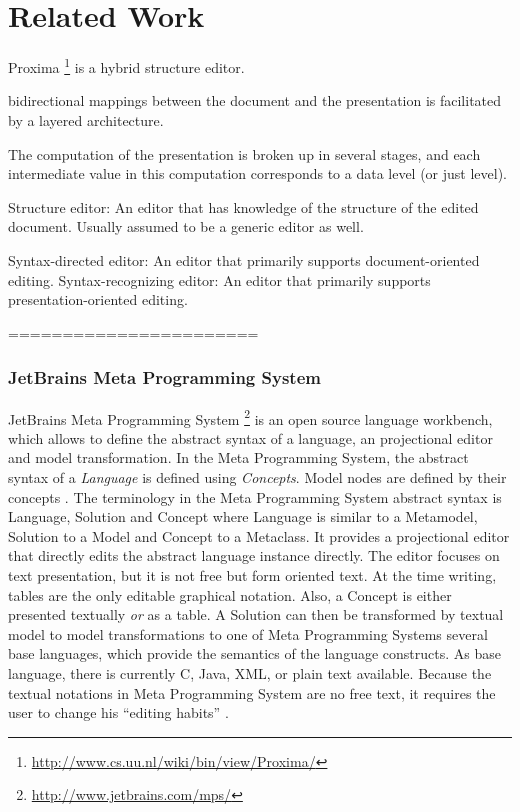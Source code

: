 \chapter{Related Work}

Proxima \footnote{\raggedright \url{http://www.cs.uu.nl/wiki/bin/view/Proxima/}}  \cite{proxima} is a hybrid structure editor.  

bidirectional mappings between the document and the presentation
is facilitated by a layered architecture.

The computation of the presentation is broken up in several stages, and each intermediate value in this computation corresponds to a data level (or just level).



Structure editor: An editor that has knowledge of the structure of the edited document.
Usually assumed to be a generic editor as well.

Syntax-directed editor: An editor that primarily supports document-oriented editing.
Syntax-recognizing editor: An editor that primarily supports presentation-oriented editing.

=======================

\subsection{JetBrains Meta Programming System}
JetBrains Meta Programming System \footnote{\raggedright \url{http://www.jetbrains.com/mps/}}  is an open source language workbench, which allows to define the abstract syntax of a language, an projectional editor and model transformation. In the Meta Programming System, the abstract syntax of a \emph{Language} is defined using \emph{Concepts}. Model nodes are defined by their concepts \cite{MPStut}. The terminology in the Meta Programming System abstract syntax is Language, Solution and Concept where Language is similar to a Metamodel, Solution to a Model and Concept to a Metaclass. It provides a projectional editor that directly edits the abstract language instance directly. The editor focuses on text presentation, but it is not free but form oriented text. At the time writing, tables are the only editable graphical notation. Also, a Concept is either presented textually \emph{or} as a table. A Solution can then be transformed by textual model to model transformations to one of  Meta Programming Systems several base languages, which provide the semantics of the language constructs. As base language, there is currently C, Java, XML, or plain text available. Because the textual notations in Meta Programming System are no free text, it requires the user to change his ``editing habits'' \cite{VolterMPS}. 

